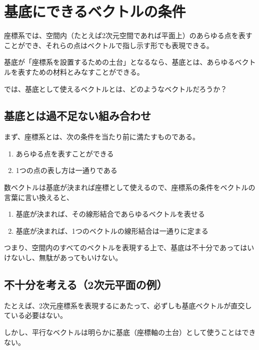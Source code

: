 \documentclass[../../../topic_linear-algebra]{subfiles}
\begin{document}
\sectionline
\section{基底にできるベクトルの条件}

座標系では、空間内（たとえば2次元空間であれば平面上）のあらゆる点を表すことができ、それらの点はベクトルで指し示す形でも表現できる。

基底が「座標系を設置するための土台」となるなら、基底とは、あらゆるベクトルを表すための材料とみなすことができる。

\br

では、基底として使えるベクトルとは、どのようなベクトルだろうか？

\subsection{基底とは過不足ない組み合わせ}

まず、座標系とは、次の条件を当たり前に満たすものである。

\begin{enumerate}[label=\romanlabel]
  \item あらゆる点を表すことができる
  \item 1つの点の表し方は一通りである
\end{enumerate}

数ベクトルは基底が決まれば座標として使えるので、座標系の条件をベクトルの言葉に言い換えると、
\begin{enumerate}[label=\romanlabel]
  \item 基底が決まれば、その線形結合であらゆるベクトルを表せる
  \item 基底が決まれば、1つのベクトルの線形結合は一通りに定まる
\end{enumerate}

つまり、空間内のすべてのベクトルを表現する上で、基底は不十分であってはいけないし、無駄があってもいけない。

\subsection{不十分を考える（2次元平面の例）}

たとえば、2次元座標系を表現するにあたって、必ずしも基底ベクトルが直交している必要はない。

しかし、平行なベクトルは明らかに基底（座標軸の土台）として使うことはできない。
\end{document}

